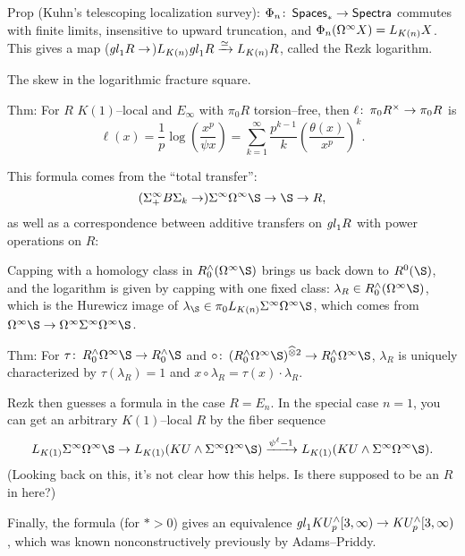 Prop (Kuhn's telescoping localization survey): $\Phi_n\colon\thinspace \mathsf{Spaces}_* \to \mathsf{Spectra}$ commutes with finite limits, insensitive to upward truncation, and $\Phi_n(\Omega^\infty X) = L_{K(n)} X$.  This gives a map ($\mathit{gl}_1 R \to$)$L_{K(n)} \mathit{gl}_1 R \xrightarrow{\simeq} L_{K(n)} R$, called the Rezk logarithm.

The skew in the logarithmic fracture square.

Thm: For $R$ $K(1)$--local and $E_\infty$ with $\pi_0 R$ torsion--free, then $\ell\colon\thinspace \pi_0 R^\times \to \pi_0 R$ is \[\ell(x) = \frac{1}{p} \log\left(\frac{x^p}{\psi x}\right) = \sum_{k=1}^\infty \frac{p^{k-1}}{k} \left(\frac{\theta(x)}{x^p}\right)^k.\]

This formula comes from the ``total transfer'': \[(\Susp^\infty_+ B\Sigma_k \to) \Susp^\infty \Loops^\infty \S \to \S \to R,\] as well as a correspondence between additive transfers on $\mathit{gl}_1 R$ with power operations on $R$:
\begin{center}
\end{center}
Capping with a homology class in $R_0^\wedge(\Loops^\infty \S)$ brings us back down to $R^0(\S)$, and the logarithm is given by capping with one fixed class: $\lambda_R \in R_0^\wedge(\Loops^\infty \S)$, which is the Hurewicz image of $\lambda_{\S} \in \pi_0 L_{K(n)} \Susp^\infty \Loops^\infty \S$, which comes from $\Loops^\infty \S \to \Loops^\infty \Susp^\infty \Loops^\infty \S$.

Thm: For $\tau\co R_0^\wedge \Loops^\infty \S \to R^\wedge_0 \S$ and $\circ\co (R^\wedge_0 \Loops^\infty \S)^{\widehat \otimes 2} \to R^\wedge_0 \Loops^\infty \S$, $\lambda_R$ is uniquely characterized by $\tau(\lambda_R) = 1$ and $x \circ \lambda_R = \tau(x) \cdot \lambda_R$.

Rezk then guesses a formula in the case $R = E_n$.  In the special case $n = 1$, you can get an arbitrary $K(1)$--local $R$ by the fiber sequence \[L_{K(1)} \Susp^\infty \Loops^\infty \S \to L_{K(1)}(KU \sm \Susp^\infty \Loops^\infty \S) \xrightarrow{\psi^\ell - 1} L_{K(1)}(KU \sm \Susp^\infty \Loops^\infty \S).\]  (Looking back on this, it's not clear how this helps. Is there supposed to be an $R$ in here?)

Finally, the formula (for $* > 0$) gives an equivalence $\mathit{gl}_1 KU^\wedge_p[3, \infty) \to KU^\wedge_p[3, \infty)$, which was known nonconstructively previously by Adams--Priddy.





